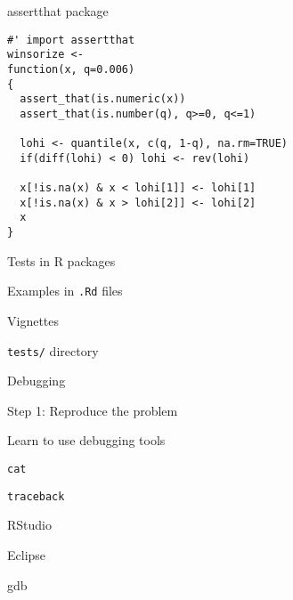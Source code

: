\documentclass[12pt,t]{beamer}
\begin{document}
\begin{frame}[fragile]{assertthat package}


\begin{lstlisting}
#' import assertthat
winsorize <-
function(x, q=0.006)
{
  assert_that(is.numeric(x))
  assert_that(is.number(q), q>=0, q<=1)

  lohi <- quantile(x, c(q, 1-q), na.rm=TRUE)
  if(diff(lohi) < 0) lohi <- rev(lohi)

  x[!is.na(x) & x < lohi[1]] <- lohi[1]
  x[!is.na(x) & x > lohi[2]] <- lohi[2]
  x
}
\end{lstlisting}


\note{
}
\end{frame}




\begin{frame}{Tests in R packages}

\bbi
\item Examples in {\tt .Rd} files
\item Vignettes
\item {\tt tests/} directory
\ei

\end{frame}





\begin{frame}[c]{Debugging}

\centerline{Step 1: Reproduce the problem}

\vspace{24pt}



\end{frame}




\begin{frame}{Learn to use debugging tools}


\bbi
\item {\tt cat}
\item {\tt traceback}
\item RStudio
\item Eclipse
\item gdb
\ei

\note{
}
\end{frame}
\end{document}
